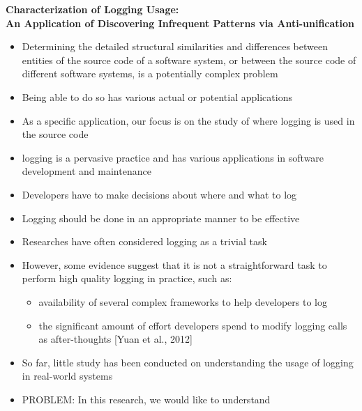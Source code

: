 \documentclass{article}
\newcommand{\tsc}{\textsc}
\begin{document}
\begin{titlepage}
   \begin{center}
      \Large\textbf{Characterization of Logging Usage:\\An Application of Discovering Infrequent Patterns via Anti-unification}
   \end{center}
\end{titlepage}

\begin{itemize} [leftmargin=.1in]
\item Determining the detailed structural similarities and differences between entities of the source code of a software system, or between the source code of different software systems, is a potentially complex problem
\item Being able to do so has various actual or potential applications%
\item As a specific application, our focus is on the study of where logging is used in the source code
\item logging is a pervasive practice and has various applications in software development and maintenance 
\item Developers have to make decisions about where and what to log
\item Logging should be done in an appropriate manner to be effective
\item Researches have often considered logging as a trivial task 
\item However, some evidence suggest that it is not a straightforward task to perform high quality logging in practice, such as:
\begin{itemize} 
\item availability of several complex frameworks to help developers to log  
\item the significant amount of effort developers spend to modify logging calls as after-thoughts [Yuan et al., 2012]
\end{itemize}
\item So far, little study has been conducted on understanding the usage of logging in real-world systems
\item \tsc{PROBLEM: }In this research, we would like to understand

\end{itemize}
\end{document}
